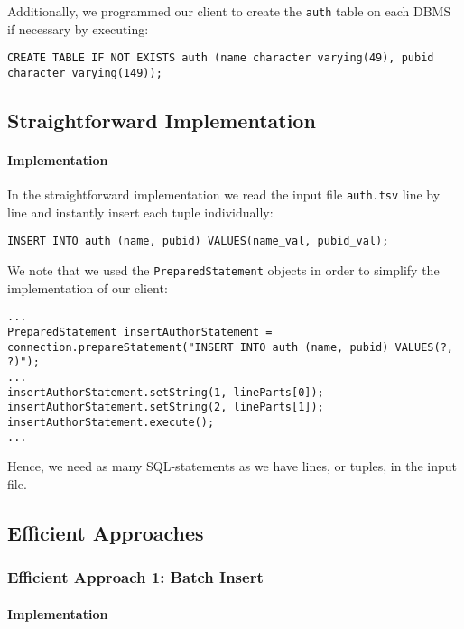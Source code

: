 \documentclass[11pt]{scrartcl}
\begin{document}
Additionally, we programmed our client to create the \texttt{auth} table on each DBMS if necessary by executing:
\begin{lstlisting}[caption={Create \texttt{auth} table}]
CREATE TABLE IF NOT EXISTS auth (name character varying(49), pubid character varying(149));
\end{lstlisting}


\subsection*{Straightforward Implementation}

\paragraph{Implementation}

In the straightforward implementation we read the input file \texttt{auth.tsv} line by line and instantly insert each
tuple individually:

\begin{lstlisting}[caption={Insert tuple individually}]
INSERT INTO auth (name, pubid) VALUES(name_val, pubid_val);
\end{lstlisting}

We note that we used the \texttt{PreparedStatement} objects in order to simplify the implementation of our client:

\begin{lstlisting}[style=mystyle-java, caption={Implementation: Straightforward approach}]
...
PreparedStatement insertAuthorStatement = connection.prepareStatement("INSERT INTO auth (name, pubid) VALUES(?, ?)");
...
insertAuthorStatement.setString(1, lineParts[0]);
insertAuthorStatement.setString(2, lineParts[1]);
insertAuthorStatement.execute();
...
\end{lstlisting}

Hence, we need as many SQL-statements as we have lines, or tuples, in the input file.

\subsection*{Efficient Approaches}

\subsubsection*{Efficient Approach 1: Batch Insert}

\paragraph{Implementation}
\end{document}
